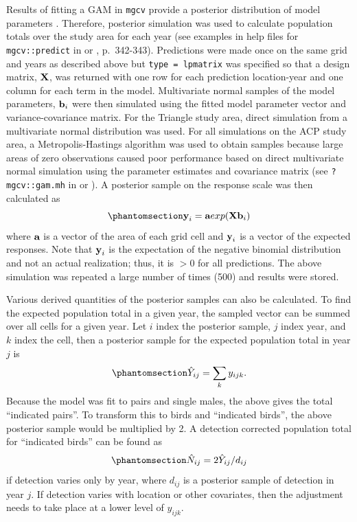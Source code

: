\documentclass[
  10pt,
  letterpaper,
]{article}
\begin{document}
Results of fitting a GAM in \texttt{mgcv} provide a posterior
distribution of model parameters \citep{wood2017}
\citep{miller2025bayesian}. Therefore, posterior simulation was used to
calculate population totals over the study area for each year (see
examples in help files for \texttt{mgcv::predict} in \citep{r-mgcv} or
\citep{wood2017}, p.~342-343). Predictions were made once on the same
grid and years as described above but \texttt{type\ =\ lpmatrix} was
specified so that a design matrix, \(\textbf X\), was returned with one
row for each prediction location-year and one column for each term in
the model. Multivariate normal samples of the model parameters,
\(\textbf b_i\) were then simulated using the fitted model parameter
vector and variance-covariance matrix. For the Triangle study area,
direct simulation from a multivariate normal distribution was used. For
all simulations on the ACP study area, a Metropolis-Hastings algorithm
was used to obtain samples because large areas of zero observations
caused poor performance based on direct multivariate normal simulation
using the parameter estimates and covariance matrix (see
\texttt{?mgcv::gam.mh} in \citep{r-mgcv} or \citep{gratiaPost}). A
posterior sample on the response scale was then calculated as
\begin{equation}\phantomsection\label{eq-3}{\textbf y_i = \textbf a exp(\textbf X \textbf b_i )}\end{equation}
where \(\textbf a\) is a vector of the area of each grid cell and
\(\textbf y_i\) is a vector of the expected responses. Note that
\(\textbf y_i\) is the expectation of the negative binomial distribution
and not an actual realization; thus, it is \(>0\) for all predictions.
The above simulation was repeated a large number of times (500) and
results were stored.

Various derived quantities of the posterior samples can also be
calculated. To find the expected population total in a given year, the
sampled vector can be summed over all cells for a given year. Let \(i\)
index the posterior sample, \(j\) index year, and \(k\) index the cell,
then a posterior sample for the expected population total in year \(j\)
is
\begin{equation}\phantomsection\label{eq-4}{\hat Y_{ij} = \sum_k y_{ijk}.}\end{equation}
Because the model was fit to pairs and single males, the above gives the
total ``indicated pairs''. To transform this to birds and ``indicated
birds'', the above posterior sample would be multiplied by 2. A
detection corrected population total for ``indicated birds'' can be
found as
\begin{equation}\phantomsection\label{eq-5}{\hat N_{ij} = 2 \hat Y _{ij}/d_{ij}}\end{equation}
if detection varies only by year, where \(d_{ij}\) is a posterior sample
of detection in year \(j\). If detection varies with location or other
covariates, then the adjustment needs to take place at a lower level of
\(y_{ijk}\).
\end{document}
